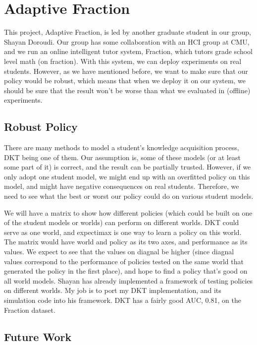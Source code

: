 \section{Adaptive Fraction}
\label{sec:fraction}

This project, Adaptive Fraction, is led by another graduate student in our group, Shayan Doroudi.
Our group has some collaboration with an HCI group at CMU, and we run an online intelligent tutor system, Fraction, which tutors grade school level math (on fraction). With this system, we can deploy experiments on real students. However, as we have mentioned before, we want to make sure that our policy would be robust, which means that when we deploy it on our system, we should be sure that the result won’t be worse than what we evaluated in (offline) experiments. 

\subsection{Robust Policy}

There are many methods to model a student's knowledge acquisition process, DKT being one of them. Our assumption is, some of these models (or at least some part of it) is correct, and the result can be partially trusted. However, if we only adopt one student model, we might end up with an overfitted policy on this model, and might have negative consequences on real students.
Therefore, we need to see what the best or worst our policy could do on various student models.

We will have a matrix to show how different policies (which could be built on one of the student models or worlds) can perform on different worlds. DKT could serve as one world, and expectimax is one way to learn a policy on this world. The matrix would have world and policy as its two axes, and performance as its values. We expect to see that the values on diagnal be higher (since diagnal values correspond to the performance of policies tested on the same world that generated the policy in the first place), and hope to find a policy that's good on all world models. Shayan has already implemented a framework of testing policies on different worlds. My job is to port my DKT implementation, and its simulation code into his framework. DKT has a fairly good AUC, 0.81, on the Fraction dataset.

\subsection{Future Work}

